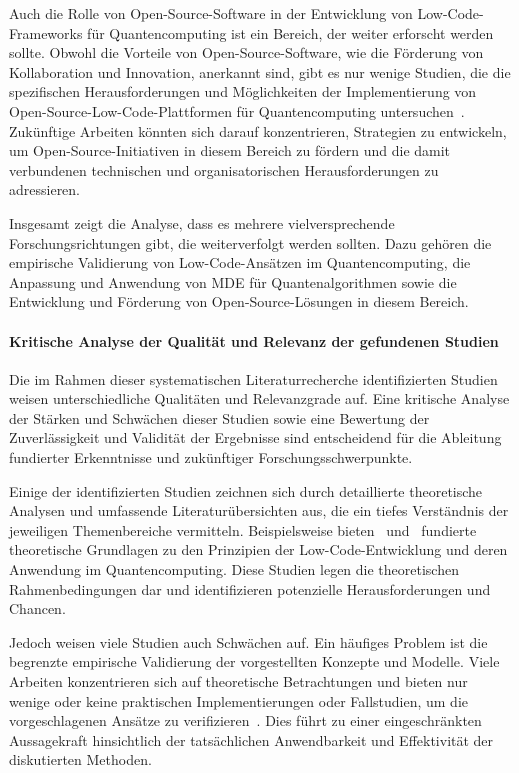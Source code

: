Auch die Rolle von Open-Source-Software in der Entwicklung von Low-Code-Frameworks für Quantencomputing ist ein Bereich, 
der weiter erforscht werden sollte. Obwohl die Vorteile von Open-Source-Software, wie die Förderung von Kollaboration und 
Innovation, anerkannt sind, gibt es nur wenige Studien, die die spezifischen Herausforderungen und Möglichkeiten der 
Implementierung von Open-Source-Low-Code-Plattformen für Quantencomputing untersuchen~\cite{Amato_2023, Ahmad_2023}. 
Zukünftige Arbeiten könnten sich darauf konzentrieren, Strategien zu entwickeln, um Open-Source-Initiativen in diesem 
Bereich zu fördern und die damit verbundenen technischen und organisatorischen Herausforderungen zu adressieren.

Insgesamt zeigt die Analyse, dass es mehrere vielversprechende Forschungsrichtungen gibt, die weiterverfolgt werden sollten. 
Dazu gehören die empirische Validierung von Low-Code-Ansätzen im Quantencomputing, die Anpassung und Anwendung von MDE für 
Quantenalgorithmen sowie die Entwicklung und Förderung von Open-Source-Lösungen in diesem Bereich. 

\paragraph{Kritische Analyse der Qualität und Relevanz der gefundenen Studien}

Die im Rahmen dieser systematischen Literaturrecherche identifizierten Studien weisen unterschiedliche 
Qualitäten und Relevanzgrade auf. Eine kritische Analyse der Stärken und Schwächen dieser Studien sowie eine Bewertung 
der Zuverlässigkeit und Validität der Ergebnisse sind entscheidend für die Ableitung fundierter Erkenntnisse und zukünftiger Forschungsschwerpunkte.

Einige der identifizierten Studien zeichnen sich durch detaillierte theoretische Analysen und umfassende 
Literaturübersichten aus, die ein tiefes Verständnis der jeweiligen Themenbereiche vermitteln. 
Beispielsweise bieten~\cite{Perez-Delgado_2020} und~\cite{Gemeinhardt_2021} fundierte theoretische Grundlagen 
zu den Prinzipien der Low-Code-Entwicklung und deren Anwendung im Quantencomputing. Diese Studien legen die 
theoretischen Rahmenbedingungen dar und identifizieren potenzielle Herausforderungen und Chancen.

Jedoch weisen viele Studien auch Schwächen auf. Ein häufiges Problem ist die begrenzte empirische Validierung 
der vorgestellten Konzepte und Modelle. Viele Arbeiten konzentrieren sich auf theoretische Betrachtungen und 
bieten nur wenige oder keine praktischen Implementierungen oder Fallstudien, um die vorgeschlagenen Ansätze 
zu verifizieren~\cite{Amato_2023}. Dies führt zu einer eingeschränkten Aussagekraft hinsichtlich der tatsächlichen 
Anwendbarkeit und Effektivität der diskutierten Methoden.

